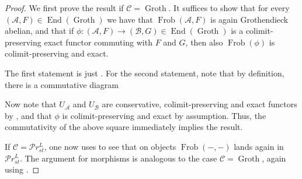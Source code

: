 \documentclass{article}
\theoremstyle{definition}
\theoremstyle{definition}
\theoremstyle{definition}
\theoremstyle{plain}
\theoremstyle{plain}
\theoremstyle{plain}
\theoremstyle{plain}
\theoremstyle{plain}
\theoremstyle{plain}
\theoremstyle{plain}
\theoremstyle{plain}
\theoremstyle{remark}
\theoremstyle{remark}
\theoremstyle{plain}
\theoremstyle{plain}
\theoremstyle{plain}
\theoremstyle{plain}
\theoremstyle{plain}
\newcommand{\Frob}[2]{\operatorname{Frob}(#1, #2)}
\newcommand{\FrobSingle}[1]{\operatorname{Frob}(#1)}
\newcommand{\End}[1]{\operatorname{End}(#1)}
\newcommand{\Cat}[1]{\mathcal{#1}}
\newcommand{\Groth}{\operatorname{Groth}}
\newcommand{\PrSt}{\mathcal{P}r^{L}_{st}}
\begin{document}
\begin{proof}
    We first prove the result if $\Cat C = \Groth$.
    It suffices to show that for every $(\Cat A, F) \in \End{\Groth}$ 
    we have that $\Frob{\Cat A}{F}$ is again Grothendieck abelian,
    and that if $\phi \colon (\Cat A, F) \to (\Cat B, G) \in \End{\Groth}$ is a colimit-preserving exact functor
    commuting with $F$ and $G$, then also $\FrobSingle{\phi}$ is colimit-preserving and exact.

    The first statement is just \cite[Corollary 2.8 (i)]{cartmod}.
    For the second statement, note that by definition, there is a commutative diagram 
    \begin{center}
    \end{center}
    Now note that $U_{\Cat A}$ and $U_{\Cat B}$ are conservative, colimit-preserving and exact functors by \cite[Corollary 2.8 (b) and (i)]{cartmod},
    and that $\phi$ is colimit-preserving and exact by assumption.
    Thus, the commutativity of the above square immediately implies the result.

    If $\Cat C = \PrSt$, one now uses \cite[Corollary 2.8 (e) and (f)]{cartmod}
    to see that on objects $\Frob{-}{-}$
    lands again in $\PrSt$. The argument for morphisms is analogous to the case $\Cat C = \Groth$,
    again using \cite[Corollary 2.8 (b) and (f)]{cartmod}.
\end{proof}
\end{document}
